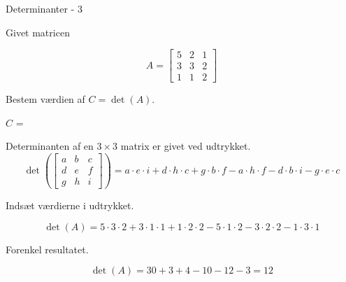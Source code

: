 \documentclass{article}
\begin{document}
\begin{exercise}{Determinanter - 3}

Givet matricen

\[
A = \left[\begin{array}{rrr}
5 & 2 & 1 \\ 
3 & 3 & 2 \\
1 & 1 & 2
\end{array} \right]
\]

Bestem værdien af $C = \det(A)$.

$C$ = 

\hint
Determinanten af en $3 \times 3$ matrix er givet ved udtrykket.
\[
\det \left( \left[\begin{array}{rrr}
a & b & c \\ 
d & e & f \\
g & h & i
\end{array} \right] \right) = a \cdot e \cdot i + d \cdot h \cdot c + g \cdot b \cdot f - a \cdot h \cdot f - d \cdot b \cdot i - g \cdot e \cdot c
\]

\hint
Indsæt værdierne i udtrykket.

\hint
\[
\det \left( A \right) = 5 \cdot 3 \cdot 2 + 3 \cdot 1 \cdot 1 + 1 \cdot 2 \cdot 2 - 5 \cdot 1 \cdot 2 - 3 \cdot 2 \cdot 2 - 1 \cdot 3 \cdot 1
\]

\hint
Forenkel resultatet.

\hint
\[
\det \left( A \right) = 30 + 3 + 4 - 10 - 12 - 3 = 12
\]

\end{exercise}
\end{document}
